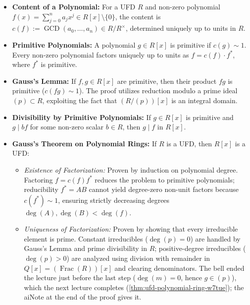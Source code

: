 \begin{overview}
\begin{itemize}
    \item \textbf{Content of a Polynomial:} For a UFD $R$ and non-zero polynomial $f(x) = \sum_{j=0}^n a_j x^j \in R[x] \setminus \{0\}$, the content is $c(f) := \operatorname{GCD}(a_0, \dots, a_n) \in R / R^\times$, determined uniquely up to units in $R$.
    \item \textbf{Primitive Polynomials:} A polynomial $g \in R[x]$ is primitive if $c(g) \sim 1$. Every non-zero polynomial factors uniquely up to units as $f = c(f) \cdot f^*$, where $f^*$ is primitive.
    \item \textbf{Gauss's Lemma:} If $f, g \in R[x]$ are primitive, then their product $fg$ is primitive ($c(fg) \sim 1$). The proof utilizes reduction modulo a prime ideal $(p) \subset R$, exploiting the fact that $(R/(p))[x]$ is an integral domain.
    \item \textbf{Divisibility by Primitive Polynomials:} If $g \in R[x]$ is primitive and $g \mid bf$ for some non-zero scalar $b \in R$, then $g \mid f$ in $R[x]$.
    \item \textbf{Gauss's Theorem on Polynomial Rings:} If $R$ is a UFD, then $R[x]$ is a UFD:
    \begin{itemize}
        \item \emph{Existence of Factorization:} Proven by induction on polynomial degree. Factoring $f = c(f) f^*$ reduces the problem to primitive polynomials; reducibility $f^* = AB$ cannot yield degree-zero non-unit factors because $c(f^*) \sim 1$, ensuring strictly decreasing degrees $\deg(A), \deg(B) < \deg(f)$.
        \item \emph{Uniqueness of Factorization:} Proven by showing that every irreducible element is prime. Constant irreducibles ($\deg(p) = 0$) are handled by Gauss's Lemma and prime divisibility in $R$; positive-degree irreducibles ($\deg(p) > 0$) are analyzed using division with remainder in $Q[x] = (\operatorname{Frac}(R))[x]$ and clearing denominators. The bell ended the lecture just before the last step ($\deg(m) = 0$, hence $g \in (p)$), which the next lecture completes (\cref{thm:ufd-polynomial-ring-w7tue}); the aiNote at the end of the proof gives it.
    \end{itemize}
\end{itemize}
\end{overview}